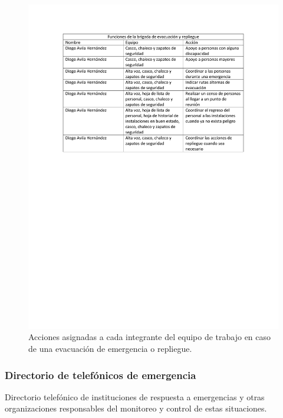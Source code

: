     \begin{figure}[H]
        \centering
        \includegraphics[trim = {20mm 120mm 20mm 25mm},clip,scale=0.5]{3/Img/brigada.pdf}
        \caption{Acciones asignadas a cada integrante del equipo de trabajo en caso de una evacuación de emergencia o repliegue.}
        \label{fig:brigada}
    \end{figure}
    \subsubsection{Directorio de telefónicos de emergencia}
    
    Directorio telefónico de instituciones de respuesta a emergencias y otras organizaciones responsables del monitoreo y control de estas situaciones.
    
